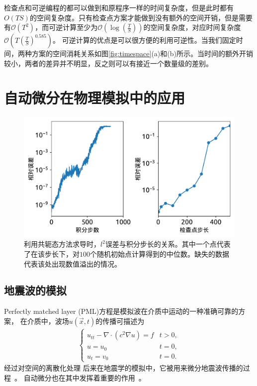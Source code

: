 \documentclass[A4,twoside,fontset=ubuntu,UTF8]{ctexart}
\newcommand{\bigO}{{\mathcal{O}}}
\begin{document}
检查点和可逆编程的都可以做到和原程序一样的时间复杂度，但是此时都有$O(TS)$的空间复杂度。只有检查点方案才能做到没有额外的空间开销，但是需要有$\bigO(T^2)$，而可逆计算至少为$\bigO(\log(\frac{T}{S}))$的空间复杂度，对应时间复杂度$\bigO(T(\frac{T}{S})^{0.585})$。
可逆计算的优点是可以很方便的利用可逆性。当我们固定时间，两种方案的空间消耗关系如图\ref{fig:timespace}(a)和(b)所示。当时间的额外开销较小，两者的差异并不明显，反之则可以有接近一个数量级的差别。

\section{自动微分在物理模拟中的应用}\label{sec:applications}

\begin{figure}[t]
\centering
\includegraphics[width=0.6\columnwidth]{./fig2.pdf}
    \caption{利用共轭态方法求导时，$l^2$误差与积分步长的关系。其中一个点代表了在该步长下，对$100$个随机初始点计算得到的中位数。缺失的数据代表该处出现数值溢出的情况。\label{fig:neuralode-error}} 
\end{figure}


\baselineskip
\subsection{地震波的模拟}
Perfectly matched layer (PML)方程是模拟波在介质中运动的一种准确可靠的方案，
在介质中，波场$u(\vec x, t)$的传播可描述为
\begin{align}
    \begin{cases}
    u_{tt} - \nabla\cdot(c^2\nabla u) = f & t>0,\\
    u = u_0 & t=0,\\
    u_t = v_0 & t=0.
    \end{cases}
\end{align}
经过对空间的离散化处理
后来在地震学的模拟中，它被用来微分地震波传播的过程~\cite{Symes2007}。
自动微分也在其中发挥着重要的作用~\cite{Zhu2020}。
~\cite{Grote2010}
\end{document}

